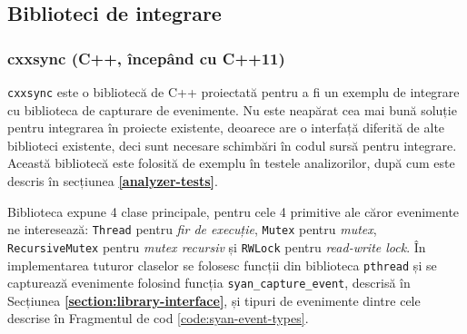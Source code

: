 \subsection{Biblioteci de integrare}
\label{integration-libraries}

\subsubsection{cxxsync (C++, începând cu C++11)}
\lstinline{cxxsync} este o bibliotecă de C++ proiectată pentru a fi un
exemplu de integrare cu biblioteca de capturare de evenimente. Nu este
neapărat cea mai bună soluție pentru integrarea în proiecte existente,
deoarece are o interfață diferită de alte biblioteci existente, deci
sunt necesare schimbări în codul sursă pentru integrare. Această
bibliotecă este folosită de exemplu în testele analizorilor, după cum
este descris în secțiunea \textbf{\ref{analyzer-tests}}.

Biblioteca expune 4 clase principale, pentru cele 4 primitive ale căror
evenimente ne interesează: \lstinline{Thread} pentru
\textit{fir de execuție}, \lstinline{Mutex} pentru \textit{mutex},
\lstinline{RecursiveMutex} pentru \textit{mutex recursiv} și
\lstinline{RWLock} pentru \textit{read-write lock}. În implementarea
tuturor claselor se folosesc funcții din biblioteca \lstinline{pthread}
și se capturează evenimente folosind funcția
\lstinline{syan_capture_event}, descrisă în Secțiunea
\textbf{\ref{section:library-interface}}, și tipuri de evenimente dintre
cele descrise în Fragmentul de cod \ref{code:syan-event-types}.

